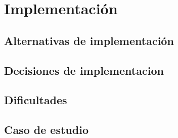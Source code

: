 \chapter{Implementación}
\label{capitulo5}

\section{Alternativas de implementación}
\label{capitulo5:alternativas_implementacion}

\section{Decisiones de implementacion}
\label{capitulo5:decisiones_implementacion}

\section{Dificultades}
\label{capitulo5:dificultades}

\section{Caso de estudio}
\label{capitulo5:caso_estudio}
